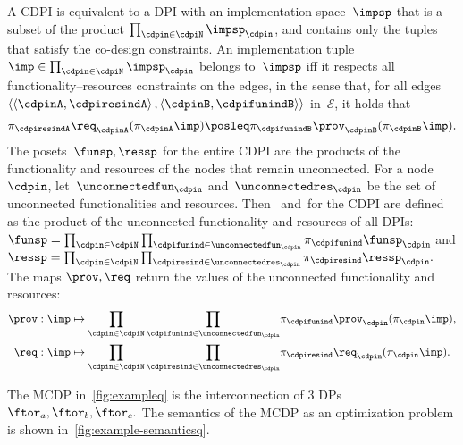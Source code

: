 A CDPI is equivalent to a DPI with an implementation space~$\impsp$
that is a subset of the product $\prod_{\cdpin\in\cdpiN}\impsp_{\cdpin}$,
and contains only the tuples that satisfy the co-design constraints.
An implementation tuple~$\imp\in\prod_{\cdpin\in\cdpiN}\impsp_{\cdpin}$
belongs to~$\impsp$ iff it respects all functionality--resources
constraints on the edges, in the sense that, for all edges~$\left\langle \left\langle \cdpinA,\cdpiresindA\right\rangle ,\left\langle \cdpinB,\cdpifunindB\right\rangle \right\rangle $
in~$\mathcal{E}$, it holds that
\[
  \pi_{\cdpiresindA}\req_{\cdpinA}(\pi_{\cdpinA}\imp)\posleq\pi_{\cdpifunindB}\prov_{\cdpinB}(\pi_{\cdpinB}\imp).
\]
The posets~$\funsp,\ressp$ for the entire CDPI are the products
of the functionality and resources of the nodes that remain unconnected.
For a node~$\cdpin$, let~$\unconnectedfun_{\cdpin}$ and~$\unconnectedres_{\cdpin}$
be the set of unconnected functionalities and resources. Then~\funsp
and~\ressp for the CDPI are defined as the product of the unconnected
functionality and resources of all DPIs: $\funsp=\prod_{\cdpin\in\cdpiN}\prod_{\cdpifunind\in\unconnectedfun_{\cdpin}}\pi_{\cdpifunind}\funsp_{\cdpin}$
and $\ressp=\prod_{\cdpin\in\cdpiN}\prod_{\cdpiresind\in\unconnectedres_{\cdpin}}\pi_{\cdpiresind}\ressp_{\cdpin}.$
The maps $\prov,\req$ return the values of the unconnected functionality
and resources:
\begin{align*}
  \prov:\imp & \mapsto{\scriptstyle {\displaystyle \prod_{\cdpin\in\cdpiN}\prod_{\cdpifunind\in\unconnectedfun_{\cdpin}}}}\pi_{\cdpifunind}\prov_{\cdpin}(\pi_{\cdpin}\imp),\\
  \req:\imp & \mapsto{\displaystyle \prod_{\cdpin\in\cdpiN}\prod_{\cdpiresind\in\unconnectedres_{\cdpin}}}\pi_{\cdpiresind}\req_{\cdpin}(\pi_{\cdpin}\imp).
\end{align*}

\begin{example}
  The MCDP in~\cref{fig:exampleq} is the interconnection of 3
  DPs $\ftor_{a},\ftor_{b},\ftor_{c}.$ The semantics of the MCDP as
  an optimization problem is shown in~\cref{fig:example-semanticsq}.
\end{example}

\\



